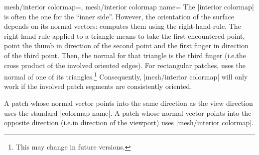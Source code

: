 {{\begin{pgfplotskeylist}{%
    mesh/interior colormap=,%
    mesh/interior colormap name=%
}
    \noindent The |interior colormap| is often the one for the ``inner side''.
    However, the orientation of the surface depends on its normal vectors:
    \PGFPlots{} computes them using the right-hand-rule. The right-hand-rule
    applied to a triangle means to take the first encountered point, point the
    thumb in direction of the second point and the first finger in direction of
    the third point. Then, the normal for that triangle is the third finger
    (i.e.\@ the cross product of the involved oriented edges). For rectangular
    patches, \PGFPlots{} uses the normal of one of its triangles.\footnote{This
    may change in future versions.} Consequently, |mesh/interior colormap|
    will only work if the involved patch segments are consistently oriented.

    A patch whose normal vector points into the same direction as the view
    direction uses the standard |colormap name|. A patch whose normal vector
    points into the opposite direction (i.e.\@ in direction of the viewport)
    uses |mesh/interior colormap|.

\pgfplotsexpensiveexample
\begin{codeexample}[]
\end{codeexample}


\end{pgfplotskeylist}}}
